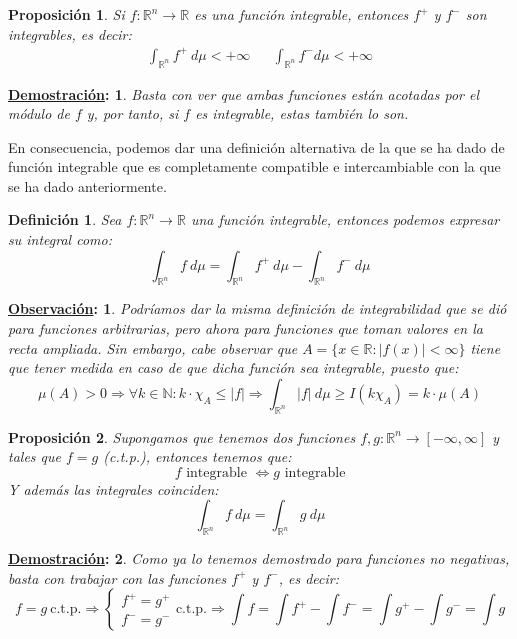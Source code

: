 \documentclass[10pt,a4paper,openright]{book}
\theoremstyle{break}
\newtheorem*{defi}{Definición}
\newtheorem*{prop}{Proposición}
\newtheorem*{demo}{\underline{Demostración}:}
\newtheorem*{obs}{\underline{Observación}:}
\newcommand{\dif}[1]{\ d#1}
\begin{document}
\begin{prop}
Si $f: \mathbb{R}^n\rightarrow\mathbb{R}$ es una función integrable, entonces $f^+$ y $f^-$ son integrables, es decir:
\begin{align*}
\int_{\mathbb{R}^n} f^+ \dif{\mu} < +\infty & & \int_{\mathbb{R}^n} f^- d \mu < +\infty
\end{align*}
\end{prop}
\begin{demo}
Basta con ver que ambas funciones están acotadas por el módulo de $f$ y, por tanto, si $f$ es integrable, estas también lo son.
\end{demo}

En consecuencia, podemos dar una definición alternativa de la que se ha dado de función integrable que es completamente compatible e intercambiable con la que se ha dado anteriormente.

\begin{defi}
Sea $f: \mathbb{R}^{n} \rightarrow \mathbb{R}$ una función integrable, entonces podemos expresar su integral como: 
$$\int_{\mathbb{R}^n} f \dif{\mu} = \int_{\mathbb{R}^n} f^+ \dif{\mu} - \int_{\mathbb{R}^n} f^- \dif{\mu}$$
\end{defi}

\begin{obs}
Podríamos dar la misma definición de integrabilidad que se dió para funciones arbitrarias, pero ahora para funciones que toman valores en la recta ampliada. Sin embargo, cabe observar que $A=\{x\in \mathbb{R}: |f(x)|< \infty\}$ tiene que tener medida en caso de que dicha función sea integrable, puesto que:
$$\mu(A) > 0 \Rightarrow \forall k \in \mathbb{N}: k\cdot \chi_A \leq |f| \Rightarrow \int_{\mathbb{R}^n} |f| \ d\mu \geq I(k\chi_A) = k \cdot \mu(A)$$
\end{obs}

\begin{prop}
Supongamos que tenemos dos funciones $f,g: \mathbb{R}^n \rightarrow [-\infty, \infty]$ y tales que $f=g$ (c.t.p.), entonces tenemos que:
$$f \mbox{ integrable }\Leftrightarrow g \mbox{ integrable}$$
Y además las integrales coinciden:
$$\int_{\mathbb{R}^n} f \dif{\mu} = \int_{\mathbb{R}^n} g \dif{\mu}$$
\end{prop}
\begin{demo}
Como ya lo tenemos demostrado para funciones no negativas, basta con trabajar con las funciones $f^+$ y $f^-$, es decir:
$$f=g \ \mbox{c.t.p.}\Rightarrow \begin{cases}
f^+ = g^+ \\ f^- = g^- 
\end{cases} \mbox{c.t.p.}\Rightarrow \int f = \int f^+ - \int f^- = \int g^+ - \int g^- = \int g$$
\end{demo}
\end{document}
